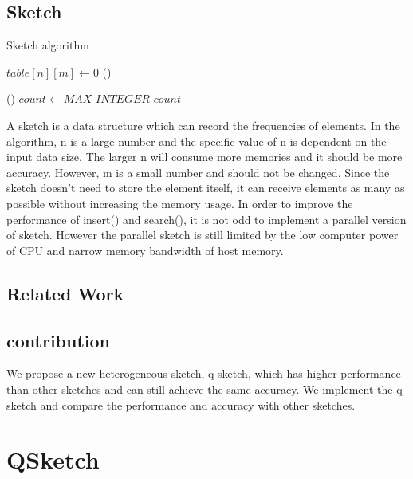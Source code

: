 \documentclass[conference]{IEEEtran}
\begin{document}
\subsection{Sketch}
\begin{algorithm}
\DontPrintSemicolon
\caption{Sketch algorithm}
$table[n][m] \longleftarrow 0$\;
\Fn()
{}
{
}

\Fn()
{}
{
    $count \leftarrow MAX\_INTEGER$\;
    \KwRet $count$\;
}
\end{algorithm}

A sketch is a data structure which can record the frequencies of elements. In the algorithm, n is a large number and the specific value of n is dependent on the input data size. The larger n will consume more memories and it should be more accuracy. However, m is a small number and should not be changed. 
Since the sketch doesn't need to store the element itself, it can receive elements as many as possible without increasing the memory usage.  
In order to improve the performance of insert() and search(), it is not odd to implement a parallel version of sketch. However the parallel sketch is still limited by the low computer power of CPU and narrow memory bandwidth of host memory. 

\subsection{Related Work}
\subsection{contribution}
We propose a new heterogeneous sketch, q-sketch, which has higher performance than other sketches and can still achieve the same accuracy. We implement the q-sketch and compare the performance and accuracy with other sketches. 
\section{QSketch}
\end{document}
